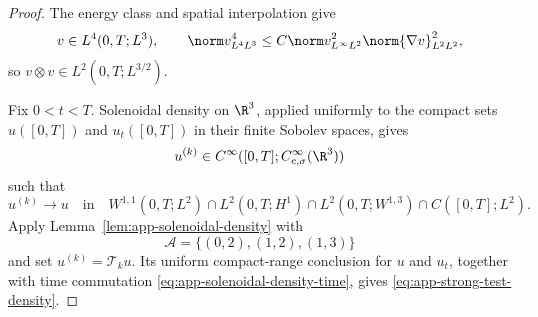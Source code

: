 \begin{proof}
The energy class and spatial interpolation give
\[
 v\in L^4(0,T;L^3),
 \qquad
 \norm v_{L^4L^3}^4
 \le C\norm v_{L^\infty L^2}^2
       \norm{\nabla v}_{L^2L^2}^2,
\]
so \(v\otimes v\in L^2(0,T;L^{3/2})\).

Fix \(0<t<T\).  Solenoidal density on \(\R^3\), applied uniformly to the
compact sets \(u([0,T])\) and \(u_t([0,T])\) in their finite Sobolev spaces,
gives
\[
 u^{(k)}\in C^\infty([0,T];C_{c,\sigma}^\infty(\R^3))
\]
such that
\begin{equation}
 u^{(k)}\longrightarrow u
 \quad\text{in}\quad
 W^{1,1}(0,T;L^2)
 \cap L^2(0,T;H^1)
 \cap L^2(0,T;W^{1,3})
 \cap C([0,T];L^2).
 \label{eq:app-strong-test-density}
\end{equation}
Apply Lemma~\ref{lem:app-solenoidal-density} with
\[
 \mathscr A=\{(0,2),(1,2),(1,3)\}
\]
and set \(u^{(k)}=\mathcal T_ku\).  Its uniform compact-range conclusion
for \(u\) and \(u_t\), together with time commutation
\eqref{eq:app-solenoidal-density-time}, gives
\eqref{eq:app-strong-test-density}.


\end{proof}

